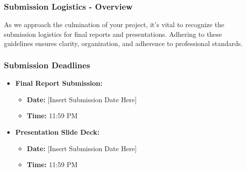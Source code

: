 \documentclass[aspectratio=169]{beamer}
\begin{document}
\begin{frame}[fragile]
    \frametitle{Submission Logistics - Overview}
    As we approach the culmination of your project, it’s vital to recognize the submission logistics for final reports and presentations. Adhering to these guidelines ensures clarity, organization, and adherence to professional standards.
\end{frame}

\begin{frame}[fragile]
    \frametitle{Submission Deadlines}
    \begin{itemize}
        \item \textbf{Final Report Submission:} 
            \begin{itemize}
                \item \textbf{Date:} [Insert Submission Date Here]
                \item \textbf{Time:} 11:59 PM
            \end{itemize}
        \item \textbf{Presentation Slide Deck:} 
            \begin{itemize}
                \item \textbf{Date:} [Insert Submission Date Here]
                \item \textbf{Time:} 11:59 PM
            \end{itemize}
    \end{itemize}
\end{frame}
\end{document}
